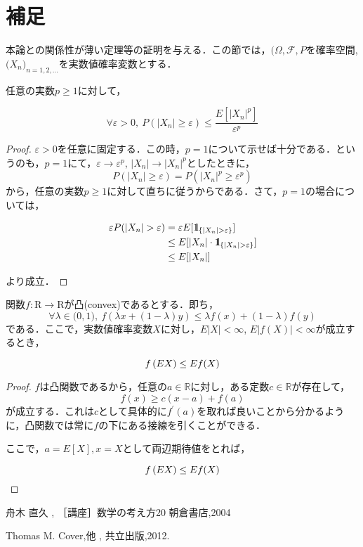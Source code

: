 \documentclass{classes/myclass}
\begin{document}
\section{補足}

本論との関係性が薄い定理等の証明を与える．この節では，$(\Omega, \mathcal{F}, P$を確率空間,$\lparen X_n \rparen_{n = 1, 2,...}$を実数値確率変数とする．

\begin{thm}
任意の実数$p \geq 1$に対して，

\[
  \forall \varepsilon > 0, \  P(|X_n| \ge \varepsilon) \leq \frac{E[{|X_n|^p}]}{\varepsilon^p}
\]
\end{thm}

\begin{proof}
 $\varepsilon > 0$を任意に固定する．この時，$p = 1$について示せば十分である．というのも，$p = 1$にて，$\varepsilon \rightarrow \varepsilon^p$, $|X_n| \rightarrow |X_n|^p$としたときに，
\[
   P(|X_n| \ge \varepsilon) =  P(|X_n|^p \ge \varepsilon^p)
\]
から，任意の実数$p \geq 1$に対して直ちに従うからである．さて，$p = 1$の場合については，

\begin{align*}
  \varepsilon P(|X_n| > \varepsilon) &= \varepsilon E[\mbox{1}\hspace{-0.25em}\mbox{l}_{\lbrace |X_n| > \varepsilon \rbrace }] \\
  &\leq E[|X_n| \cdot \mbox{1}\hspace{-0.25em}\mbox{l}_{\lbrace |X_n| > \varepsilon \rbrace}] \\
  &\leq E[|X_n|]
\end{align*}

より成立．
\end{proof}

\begin{thm}[Jensenの不等式]
関数$f: \mathrm{R} \to \mathrm{R}$が凸(convex)であるとする．即ち，
\[
  \forall \lambda \in \lparen 0, 1 \rparen, \  f(\lambda x + (1 - \lambda)y) \leq \lambda f(x) + (1 - \lambda ) f(y)
\]
である．ここで，実数値確率変数$X$に対し，$E|X| < \infty$, $E|f(X)| < \infty$が成立するとき，

\[
  f \left \lparen E X \right \rparen \leq E f(X)
\]
\end{thm}

\begin{proof}
$f$は凸関数であるから，任意の$a \in \mathbb{R}$に対し，ある定数$c \in \mathbb{R}$が存在して，
\[
  f(x) \geq c(x - a) + f(a)
\]
が成立する．これは$c$として具体的に$f^{\prime}(a)$を取れば良いことから分かるように，凸関数では常に$f$の下にある接線を引くことができる．

ここで，$a = E[X], x = X$として両辺期待値をとれば，

\[
  f \left \lparen E X \right \rparen \leq E f(X)
\]
\end{proof}


\begin{thebibliography}{9}

舟木 直久
, ［講座］数学の考え方20
\newblock 朝倉書店,2004

Thomas M. Cover,他
,
\newblock 共立出版,2012.

\end{thebibliography}
\end{document}
